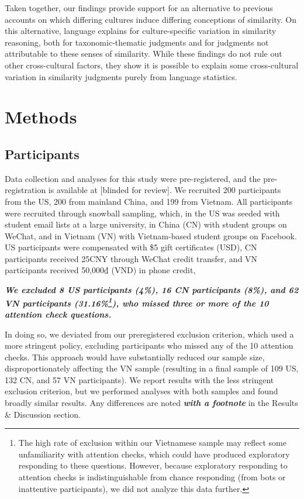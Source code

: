 \documentclass[10pt, letterpaper]{article}
\begin{document}
Taken together, our findings provide support for an alternative to
previous accounts on which differing cultures induce differing
conceptions of similarity. On this alternative, language explains for
culture-specific variation in similarity reasoning, both for
taxonomic-thematic judgments and for judgments not attributable to these
senses of similarity. While these findings do not rule out other
cross-cultural factors, they show it is possible to explain some
cross-cultural variation in similarity judgments purely from language
statistics.

\hypertarget{methods}{%
\section{Methods}\label{methods}}

\hypertarget{participants}{%
\subsection{Participants}\label{participants}}

Data collection and analyses for this study were pre-registered, and the
pre-registration is available at {[}blinded for review{]}. We recruited
200 participants from the US, 200 from mainland China, and 199 from
Vietnam. All participants were recruited through snowball sampling,
which, in the US was seeded with student email lists at a large
university, in China (CN) with student groups on WeChat, and in Vietnam
(VN) with Vietnam-based student groups on Facebook. US participants were
compensated with \$5 gift certificates (USD), CN participants received
25CNY through WeChat credit transfer, and VN participants received
50,000₫ (VND) in phone credit,

\textbf{\emph{We excluded 8 US participants (4\%), 16 CN participants
(8\%), and 62 VN participants (31.16\%\footnote{The high rate of
  exclusion within our Vietnamese sample may reflect some unfamiliarity
  with attention checks, which could have produced exploratory
  responding to these questions. However, because exploratory responding
  to attention checks is indistinguishable from chance responding (from
  bots or inattentive participants), we did not analyze this data
  further.}), who missed three or more of the 10 attention check
questions.}}

In doing so, we deviated from our preregistered exclusion criterion,
which used a more stringent policy, excluding participants who missed
any of the 10 attention checks. This approach would have substantially
reduced our sample size, disproportionately affecting the VN sample
(resulting in a final sample of 109 US, 132 CN, and 57 VN participants).
We report results with the less stringent exclusion criterion, but we
performed analyses with both samples and found broadly similar results.
Any differences are noted \textbf{\emph{with a footnote}} in the Results
\& Discussion section.
\end{document}
